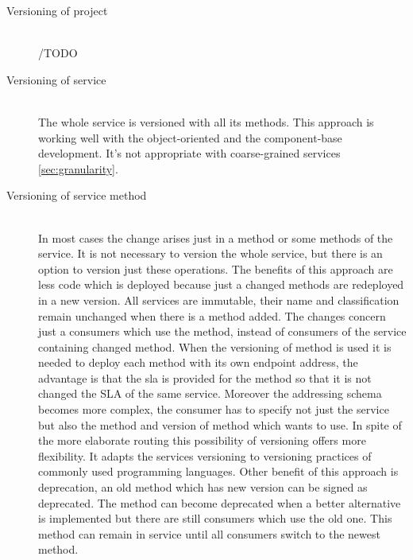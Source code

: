 \begin{description}
  \item[Versioning of project] \hfil\\
  /TODO 
  \item[Versioning of service] \hfill\\
  The whole service is versioned with all its methods. This approach is working well with the object-oriented and the component-base development. It's not appropriate with coarse-grained services \ref{sec:granularity}.%
  \item[Versioning of service method]  \hfill\\
  In most cases the change arises just in a method or some methods of the service. It is not necessary to version the whole service, but there is an option to version just these operations.
  The benefits of this approach are less code which is deployed because just a changed methods are redeployed in a new version. All services are immutable, their name and classification remain unchanged when there is a method added. The changes concern just a consumers which use the method, instead of consumers of the service containing changed method. 
  When the versioning of method is used it is needed to deploy each method with its own endpoint address, the advantage is that the \gls{sla} is provided for the method so that it is not changed the SLA of the same service.
  Moreover the addressing schema becomes more complex, the consumer has to specify not just the service but also the method and version of method which wants to use.
In spite of the more elaborate routing this possibility of versioning offers more flexibility. It adapts the services versioning to versioning practices of commonly used programming languages. 
Other benefit of this approach is deprecation, an old method which has new version can be signed as deprecated. The method can become deprecated when a better alternative is implemented but there are still consumers which use the old one. This method can remain in service until all consumers switch to the newest method.
\end{description}


